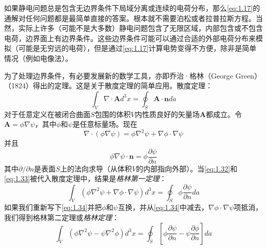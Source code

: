 \documentclass[12pt]{book}
\numberwithin{equation}{chapter}
\numberwithin{figure}{chapter}
\numberwithin{footnote}{page}
\begin{document}
如果静电问题总是包含无边界条件下局域分离或连续的电荷分布，那么\autoref{eq:1.17}的通解对任何问题都是最简单直接的答案。根本就不需要泊松或者拉普拉斯方程。当然，实际上许多（可能不是大多数）静电问题包含了无限区域，内部包含或不包含电荷，边界面上有边界条件。这些边界条件可能可以通过合适的外部电荷分布来模拟（可能是无穷远的电荷），但是通过\autoref{eq:1.17}计算电势变得不方便，除非是简单情况（例如电像法）。

为了处理边界条件，有必要发展新的数学工具，亦即乔治·格林（George Green）（1824）得出的定理。这是关于散度定理的简单应用。散度定理：
$$\int_V \nabla\cdot\mathbf{A}d^3x=\oint_S \mathbf{A}\cdot\mathbf{n}da$$
对于任意定义在被闭合曲面$S$包围的体积$V$内性质良好的矢量场$\mathbf{A}$都成立。令$\mathbf{A}=\phi\nabla\psi$，其中$\phi$和$\psi$是任意标量场。现在
\begin{equation}\label{eq:1.32}
    \nabla\cdot(\phi\nabla\psi)=\phi\nabla^2\psi+\nabla\phi\cdot\nabla\psi
\end{equation}
并且
\begin{equation}\label{eq:1.33}
    \phi\nabla\psi\cdot\mathbf{n}=\phi\frac{\partial \psi}{\partial n}
\end{equation}
其中$\partial/\partial n$是表面$S$上的法向求导（从体积$V$的内部指向外部）。当\autoref{eq:1.32}和\autoref{eq:1.33}被代入散度定理中，结果是\textit{格林第一定理}：
\begin{equation}\label{eq:1.34}
    \int_V (\phi\nabla^2\psi+\nabla\phi\cdot\nabla\psi)d^3x=\oint_S \phi\frac{\partial \psi}{\partial n} da
\end{equation}
如果我们重新写下\autoref{eq:1.34}并把$\phi$和$\psi$互换，并从\autoref{eq:1.34}中减去，$\nabla\phi\cdot\nabla\psi$项抵消，我们得到格林第二定理或\textit{格林定理}：
\begin{equation}\label{eq:1.35}
    \int_V (\phi\nabla^2\psi-\psi\nabla^2\phi)d^3x=\oint_S [\phi\frac{\partial \psi}{\partial n}-\psi\frac{\partial \phi}{\partial n}]da
\end{equation}
\end{document}
